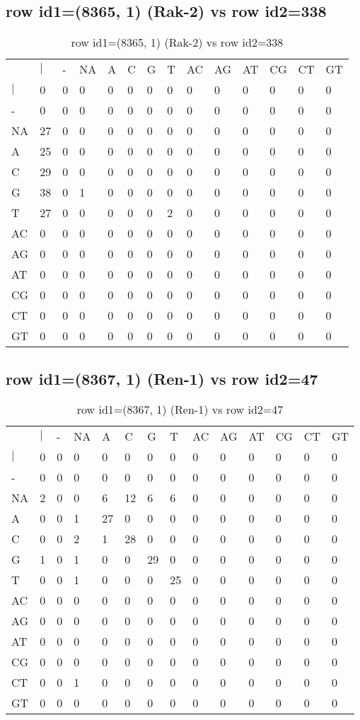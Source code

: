 \subsection{row id1=(8365, 1) (Rak-2) vs row id2=338}
\begin{center}
\begin{longtable}{|l|l|l|l|l|l|l|l|l|l|l|l|l|l|}
\caption{row id1=(8365, 1) (Rak-2) vs row id2=338} \label{table_dm596}\\
\hline
\\
\hline
&$|$&-&NA&A&C&G&T&AC&AG&AT&CG&CT&GT\\
$|$&0&0&0&0&0&0&0&0&0&0&0&0&0\\
-&0&0&0&0&0&0&0&0&0&0&0&0&0\\
NA&27&0&0&0&0&0&0&0&0&0&0&0&0\\
A&25&0&0&0&0&0&0&0&0&0&0&0&0\\
C&29&0&0&0&0&0&0&0&0&0&0&0&0\\
G&38&0&1&0&0&0&0&0&0&0&0&0&0\\
T&27&0&0&0&0&0&2&0&0&0&0&0&0\\
AC&0&0&0&0&0&0&0&0&0&0&0&0&0\\
AG&0&0&0&0&0&0&0&0&0&0&0&0&0\\
AT&0&0&0&0&0&0&0&0&0&0&0&0&0\\
CG&0&0&0&0&0&0&0&0&0&0&0&0&0\\
CT&0&0&0&0&0&0&0&0&0&0&0&0&0\\
GT&0&0&0&0&0&0&0&0&0&0&0&0&0\\
\hline
\end{longtable}
\end{center}

\subsection{row id1=(8367, 1) (Ren-1) vs row id2=47}
\begin{center}
\begin{longtable}{|l|l|l|l|l|l|l|l|l|l|l|l|l|l|}
\caption{row id1=(8367, 1) (Ren-1) vs row id2=47} \label{table_dm598}\\
\hline
\\
\hline
&$|$&-&NA&A&C&G&T&AC&AG&AT&CG&CT&GT\\
$|$&0&0&0&0&0&0&0&0&0&0&0&0&0\\
-&0&0&0&0&0&0&0&0&0&0&0&0&0\\
NA&2&0&0&6&12&6&6&0&0&0&0&0&0\\
A&0&0&1&27&0&0&0&0&0&0&0&0&0\\
C&0&0&2&1&28&0&0&0&0&0&0&0&0\\
G&1&0&1&0&0&29&0&0&0&0&0&0&0\\
T&0&0&1&0&0&0&25&0&0&0&0&0&0\\
AC&0&0&0&0&0&0&0&0&0&0&0&0&0\\
AG&0&0&0&0&0&0&0&0&0&0&0&0&0\\
AT&0&0&0&0&0&0&0&0&0&0&0&0&0\\
CG&0&0&0&0&0&0&0&0&0&0&0&0&0\\
CT&0&0&1&0&0&0&0&0&0&0&0&0&0\\
GT&0&0&0&0&0&0&0&0&0&0&0&0&0\\
\hline
\end{longtable}
\end{center}

